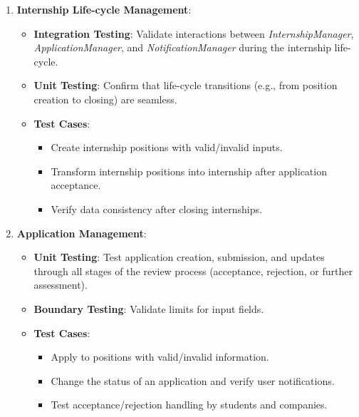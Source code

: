 \begin{enumerate}
        \item \textbf{Internship Life-cycle Management}:
        \begin{itemize}
            \item \textbf{Integration Testing}: 
            Validate interactions between \textit{InternshipManager}, \textit{ApplicationManager}, and \textit{NotificationManager} during the internship life-cycle.
            \item \textbf{Unit Testing}: 
            Confirm that life-cycle transitions (e.g., from position creation to closing) are seamless.
            \item \textbf{Test Cases}:
            \begin{itemize}
                \item Create internship positions with valid/invalid inputs.
                \item Transform internship positions into internship after application acceptance.
                \item Verify data consistency after closing internships.
            \end{itemize}
        \end{itemize}
    
        \item \textbf{Application Management}:
        \begin{itemize}
            \item \textbf{Unit Testing}: 
            Test application creation, submission, and updates through all stages of the review process (acceptance, rejection, or further assessment).
            \item \textbf{Boundary Testing}: 
            Validate limits for input fields.
            \item \textbf{Test Cases}:
            \begin{itemize}
                \item Apply to positions with valid/invalid information.
                \item Change the status of an application and verify user notifications.
                \item Test acceptance/rejection handling by students and companies.
            \end{itemize}
        \end{itemize}
    

\end{enumerate}
